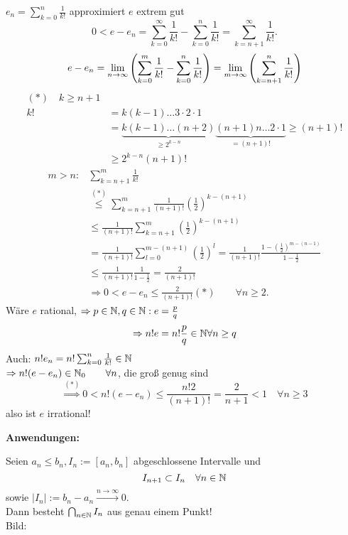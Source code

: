 \documentclass[../ana1.tex]{subfiles}
\begin{document}
\begin{bew}
	\(e_n = \sum_{k=0}^{n} \frac{1}{k!} \) approximiert \(e\) extrem gut\\
	\[ 0< e-e_n = \sum_{k=0}^{\infty} \frac{1}{k!} - \sum_{k=0}^{n} \frac{1}{k!} = \sum_{k=n+1}^{\infty} \frac{1}{k!}. \]
	\[e-e_n = \lim\limits_{n\rightarrow\infty}\left( \sum_{k=0}^{m} \frac{1}{k!} - \sum_{k=0}^{n} \frac{1}{k!} \right) = \lim\limits_{m\rightarrow\infty} \left(\sum_{k=n+1}^{n} \frac{1}{k!} \right) \]
	\begin{align*}
	 	(*)\quad k \geq n+1\\
		k! &= k(k-1)\dots 3\cdot 2\cdot 1\\
		&=\underbrace{k(k-1)\dots(n+2)}_{\geq 2^{k-n}}\underbrace{(n+1)n\dots 2\cdot 1}_{=(n+1)!} \geq (n+1)!\\
		&\geq 2^{k-n}(n+1)!
	\end{align*}
	\begin{align*}
		m>n: &\sum_{k=n+1}^{m} \frac{1}{k!}\\
		&\overset{(*)}{\leq} \sum_{k=n+1}^{m} \frac{1}{(n+1)!} {\left(\frac{1}{2}\right)}^{k-(n+1)}\\
		&\leq \frac{1}{(n+1)!} \sum_{k=n+1}^{m} {\left(\frac{1}{2}\right)}^{k-(n+1)}\\
		&= \frac{1}{(n+1)!} \sum_{l=0}^{m-(n+1)} {(\frac{1}{2})}^l = \frac{1}{(n+1)!} \frac{1-{(\frac{1}{2})}^{m-(n-1)}}{1-\frac{1}{2}}\\
		&\leq \frac{1}{(n+1)!} \frac{1}{1-\frac{1}{2}} = \frac{2}{(n+1)!}\\
		&\Rightarrow 0 < e - e_n \leq \frac{2}{(n+1)!} (*) \qquad\forall n\geq 2.
	\end{align*}
	Wäre \(e\) rational, \(\Rightarrow p\in\mathbb{N},q\in\mathbb{N}:e=\frac{p}{q} \)
	\[ \Rightarrow n! e = n! \frac{p}{q} \in\mathbb{N} \forall n\geq q \]
	Auch: \( n! e_n = n! \sum_{k=0}^{n} \frac{1}{k!} \in\mathbb{N} \) \\
	\( \Rightarrow n!(e-e_n) \in\mathbb{N}_0 \qquad \forall n \), die groß genug sind
	\[ \overset{(*)}{\Rightarrow} 0<n!(e-e_n) \leq \frac{n!2}{(n+1)!} = \frac{2}{n+1} < 1 \quad \forall n\geq 3 \]
	\Lightning{} also ist \(e\) irrational!
\end{bew}
\textbf{Anwendungen:}
\begin{satz}[Invervallschachtelungsprinzip]
	Seien \( a_n\leq b_n, I_n := [a_n,b_n] \) abgeschlossene Intervalle und \[I_{n+1} \subset I_n \quad \forall n\in\mathbb{N} \]
	sowie \( |I_n| := b_n - a_n \overset{n\rightarrow\infty}{\rightarrow} 0 \).\\
	Dann besteht \(\bigcap_{n\in\mathbb{N}} I_n\) aus genau einem Punkt!\\
	Bild: 
	\begin{center}
	\end{center}
\end{satz}
\end{document}
